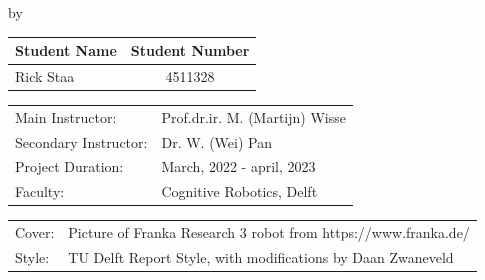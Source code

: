 \begin{titlepage}

\begin{center}

{\makeatletter
\largetitlestyle\fontsize{45}{45}\selectfont\@title
\makeatother}

{\makeatletter
\ifdefvoid{\@subtitle}{}{\bigskip\titlestyle\fontsize{20}{20}\selectfont\@subtitle}
\makeatother}

\bigskip
\bigskip

by

\bigskip
\bigskip

{\makeatletter
\largetitlestyle\fontsize{25}{25}\selectfont\@author
\makeatother}

\bigskip
\bigskip

\setlength\extrarowheight{2pt}
\begin{tabular}{lc}
    Student Name & Student Number \\\midrule
    Rick Staa & 4511328 \\
\end{tabular}

\vfill

\begin{tabular}{ll}
    Main Instructor: & Prof.dr.ir. M. (Martijn) Wisse \\
    Secondary Instructor: & Dr. W. (Wei) Pan \\
    Project Duration: & March, 2022 - april, 2023 \\
    Faculty: & Cognitive Robotics, Delft
\end{tabular}

\bigskip
\bigskip

\begin{tabular}{p{15mm}p{10cm}}
    Cover: & Picture of Franka Research 3 robot from https://www.franka.de/\\
    Style: & TU Delft Report Style, with modifications by Daan Zwaneveld
\end{tabular}

\end{center}


\end{titlepage}
